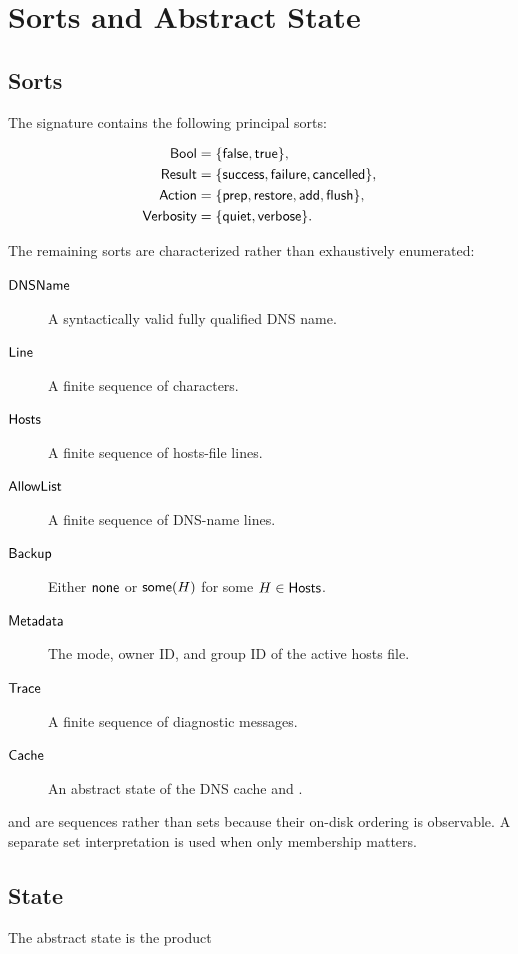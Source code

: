 \section{Sorts and Abstract State}

\subsection{Sorts}

The signature contains the following principal sorts:

\begin{align*}
\mathsf{Bool}      &= \{\mathsf{false},\mathsf{true}\},\\
\mathsf{Result}    &= \{\mathsf{success},\mathsf{failure},\mathsf{cancelled}\},\\
\mathsf{Action}    &= \{\mathsf{prep},\mathsf{restore},\mathsf{add},\mathsf{flush}\},\\
\mathsf{Verbosity} &= \{\mathsf{quiet},\mathsf{verbose}\}.
\end{align*}

The remaining sorts are characterized rather than exhaustively enumerated:

\begin{description}
  \item[$\mathsf{DNSName}$] A syntactically valid fully qualified DNS name.
  \item[$\mathsf{Line}$] A finite sequence of characters.
  \item[$\mathsf{Hosts}$] A finite sequence of hosts-file lines.
  \item[$\mathsf{AllowList}$] A finite sequence of DNS-name lines.
  \item[$\mathsf{Backup}$] Either $\mathsf{none}$ or $\mathsf{some}(H)$ for some $H\in\mathsf{Hosts}$.
  \item[$\mathsf{Metadata}$] The mode, owner ID, and group ID of the active hosts file.
  \item[$\mathsf{Trace}$] A finite sequence of diagnostic messages.
  \item[$\mathsf{Cache}$] An abstract state of the DNS cache and
        .
\end{description}

\Hosts{} and \AllowList{} are sequences rather than sets because their on-disk
ordering is observable.  A separate set interpretation is used when only
membership matters.

\subsection{State}

The abstract state is the product

